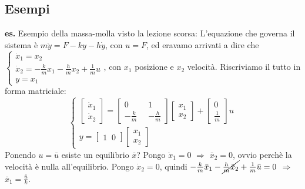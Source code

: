 \subsection{Esempi}
\textbf{es.} Esempio della massa-molla visto la lezione scorsa:\newline
L'equazione che governa il sistema è $m \ddot{y} = F - ky - h \dot{y}$, con $u = F$, ed eravamo arrivati a dire che $\begin{cases}
    \dot{x}_1 = x_2\\
    \dot{x}_2 = - \frac{k}{m}x_1 - \frac{h}{m}x_2 + \frac{1}{m}u\\
    y = x_1
\end{cases}$, con $x_1$ posizione e $x_2$ velocità.\newline
Riscriviamo il tutto in forma matriciale:
\[
    \begin{cases}
        \left[\begin{matrix}
            \dot{x}_1\\
            \dot{x}_2
        \end{matrix}\right] = \left[\begin{matrix}
            0 \;\; &1\\
            - \frac{k}{m} \;\;& - \frac{h}{m}
        \end{matrix}\right] \left[\begin{matrix}
            x_1\\
            x_2
        \end{matrix}\right] + \left[\begin{matrix}
            0 \\
            \frac{1}{m}
        \end{matrix}\right] u\\
        y = \left[\begin{matrix}
            1 \;\;0
        \end{matrix}\right] \left[\begin{matrix}
            x_1\\
            x_2
        \end{matrix}\right]
    \end{cases}
\]
Ponendo $u = \bar{u}$ esiste un equilibrio $\bar{x}$?\newline
Pongo $\dot{x}_1 = 0$ $\Longrightarrow$ $\bar{x}_2 = 0$, ovvio perchè la velocità è nulla all'equilibrio.\newline
Pongo $\dot{x}_2 = 0$, quindi $- \frac{k}{m} \bar{x}_1 - \cancel{ \frac{h}{m}\bar{x}_2} + \frac{1}{m}\bar{u} = 0$ $\Longrightarrow$ $\bar{x}_1 = \frac{\bar{u}}{k}$.\newline
